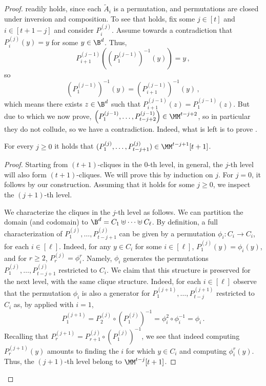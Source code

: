 \begin{proof}
 readily holds, since each $\widetilde{A}_i$ is a permutation, and permutations are closed
under inversion and composition. To see that  holds, fix some
$j \in [t]$ and $i \in [t+1-j]$ and consider $P_{i}^{(j)}$. Assume
towards a contradiction that $P_{i}^{(j)}(y) = y$ for some $y \in \B^d$. Thus,
\[
P_{i+1}^{(j-1)} \left( \left(P_{1}^{(j-1)}\right)^{-1}(y)\right) = y\,,
\]
so
\[
\left(P_{1}^{(j-1)}\right)^{-1}(y) = \left( P_{i+1}^{(j-1)} \right)^{-1}(y)\,,
\]
which means there exists $z \in \B^d$ such that $P_{i+1}^{(j-1)}(z) = P_{1}^{(j-1)}(z)$.
But due to  which we now prove, $\left( P_{1}^{(j-1)},\ldots,P_{t-j+2}^{(j-1)} \right) \in \MM^{t-j+2}$,
so in particular they do not collude, so we have a contradiction. Indeed, what is left is 
to prove .
\begin{claim}
For every $j \ge 0$ it holds that $( P_{1}^{(j)},\ldots,P_{t-j+1}^{(j)} ) \in \MM^{t-j+1}[t+1]$.
\end{claim}
\begin{proof}
Starting from $(t+1)$-cliques in the $0$-th level, in general, the $j$-th level
will also form $(t+1)$-cliques. We will prove this by induction on $j$. For $j = 0$, it follows
by our construction. Assuming that it holds for some $j \ge 0$, we inspect the $(j+1)$-th level.

We characterize the cliques in the $j$-th level as follows. We can partition the domain (and codomain)
to $\B^d = C_1 \uplus \cdots \uplus C_{\ell}$. By definition, a full characterization of
$P_1^{(j)},\ldots,P_{t-j+1}^{(j)}$ can be given by a permutation
$\phi_i \colon C_i \rightarrow C_i$, for each $i \in [\ell]$. Indeed, 
for any $y \in C_i$ for some $i \in [\ell]$, $P_{1}^{(j)}(y) = \phi_{i}(y)$, and
for $r \ge 2$, $P_{r}^{(j)} = \phi_{i}^r$. Namely, $\phi_i$ generates the permutations $P_1^{(j)},\ldots,P_{t-j+1}^{(j)}$ restricted to $C_i$.
We claim that this structure is preserved for the next level, with the same clique structure. Indeed, for each $i \in [\ell]$ observe that the permutation ${\phi}_i$ is also a generator for $P_1^{(j+1)},\ldots,P_{t-j}^{(j+1)}$ restricted to $C_i$ as, by  applied with $i=1$,
\[
P^{(j+1)}_{1} = P_{2}^{(j)} \circ \left( P_{1}^{(j)} \right)^{-1} = \phi_i^2 \circ \phi_i^{-1} = \phi_i\,.
\]
%
%
%
Recalling that $P^{(j+1)}_{r} = P_{r+1}^{(j)} \circ \left( P_{1}^{(j)} \right)^{-1}$, we see that indeed
computing $P^{(j+1)}_{r}(y)$ amounts to finding the $i$ for which $y \in C_i$
and computing $\phi_i^r(y)$. Thus, the $(j+1)$-th level belong to $\MM^{t-j}[t+1]$.
\end{proof}
\end{proof}


